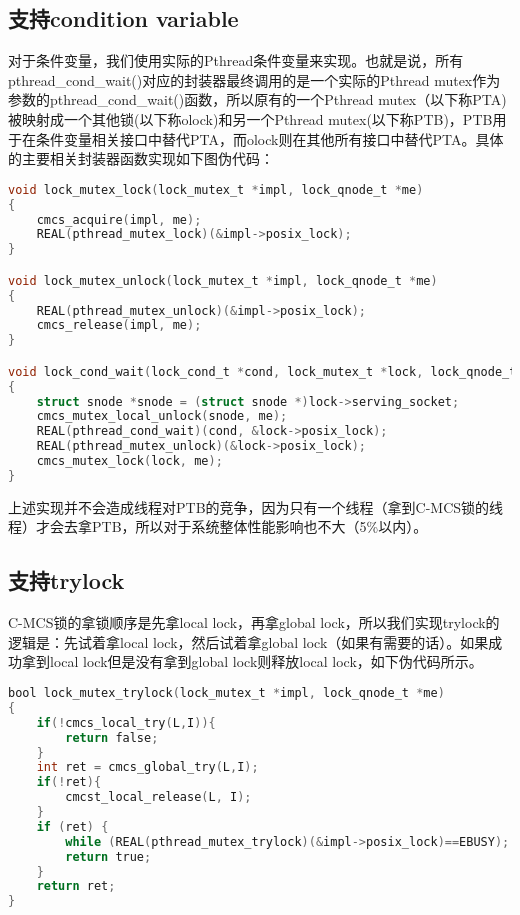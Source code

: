 \subsection{支持condition variable}
对于条件变量，我们使用实际的Pthread条件变量来实现。也就是说，所有pthread\_cond\_wait()对应的封装器最终调用的是一个实际的Pthread mutex作为参数的pthread\_cond\_wait()函数，所以原有的一个Pthread mutex（以下称PTA)被映射成一个其他锁(以下称olock)和另一个Pthread mutex(以下称PTB)，PTB用于在条件变量相关接口中替代PTA，而olock则在其他所有接口中替代PTA。具体的主要相关封装器函数实现如下图伪代码：
\begin{lstlisting}[language={C}, caption={在cstmcs中支持体条件变量}]
void lock_mutex_lock(lock_mutex_t *impl, lock_qnode_t *me)
{
    cmcs_acquire(impl, me);
    REAL(pthread_mutex_lock)(&impl->posix_lock);
}

void lock_mutex_unlock(lock_mutex_t *impl, lock_qnode_t *me)
{
    REAL(pthread_mutex_unlock)(&impl->posix_lock);
    cmcs_release(impl, me);
}

void lock_cond_wait(lock_cond_t *cond, lock_mutex_t *lock, lock_qnode_t *me)
{
    struct snode *snode = (struct snode *)lock->serving_socket;
    cmcs_mutex_local_unlock(snode, me);
    REAL(pthread_cond_wait)(cond, &lock->posix_lock);
    REAL(pthread_mutex_unlock)(&lock->posix_lock); 
    cmcs_mutex_lock(lock, me);
}
\end{lstlisting}
上述实现并不会造成线程对PTB的竞争，因为只有一个线程（拿到C-MCS锁的线程）才会去拿PTB，所以对于系统整体性能影响也不大（5\%以内）\cite{guiroux2016multicore}。

\subsection{支持trylock}
C-MCS锁的拿锁顺序是先拿local lock，再拿global lock，所以我们实现trylock的逻辑是：先试着拿local lock，然后试着拿global lock（如果有需要的话）。如果成功拿到local lock但是没有拿到global lock则释放local lock，如下伪代码所示。
\begin{lstlisting}[language={C}, caption={在cstmcs中支持trylock}]
bool lock_mutex_trylock(lock_mutex_t *impl, lock_qnode_t *me)
{
    if(!cmcs_local_try(L,I)){
        return false;
    }
    int ret = cmcs_global_try(L,I);
    if(!ret){
        cmcst_local_release(L, I);
    }
    if (ret) { 
        while (REAL(pthread_mutex_trylock)(&impl->posix_lock)==EBUSY);
        return true;
    }
    return ret;
}

\end{lstlisting}

